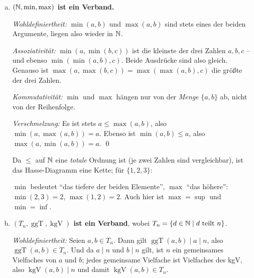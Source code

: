 \begin{loesung}
\begin{enumerate}[a)]
  Anschaulich: $A\cup B$ ist der \emph{tiefste gemeinsame Punkt oberhalb} von $A$ und $B$, $A\cap B$ der \emph{höchste gemeinsame Punkt unterhalb}. Beispiel: $\{a\}\cup\{b\}=\{a,b\}$ und $\{a,b\}\cap\{b,c\}=\{b\}$ -- beides direkt am Diagramm ablesbar. Es ist also $\cup=\sup$ und $\cap=\inf$ (vgl.\ Aufgabe~6).

  \item \textbf{$(\mathbb{N},\min,\max)$ ist ein Verband.}

  \emph{Wohldefiniertheit:} $\min(a,b)$ und $\max(a,b)$ sind stets eines der beiden Argumente, liegen also wieder in $\mathbb{N}$.

  \emph{Assoziativität:} $\min(a,\min(b,c))$ ist die kleinste der drei Zahlen $a,b,c$ -- und ebenso $\min(\min(a,b),c)$. Beide Ausdrücke sind also gleich. Genauso ist $\max(a,\max(b,c))=\max(\max(a,b),c)$ die größte der drei Zahlen.

  \emph{Kommutativität:} $\min$ und $\max$ hängen nur von der \emph{Menge} $\{a,b\}$ ab, nicht von der Reihenfolge.

  \emph{Verschmelzung:} Es ist stets $a\leq\max(a,b)$, also $\min(a,\max(a,b))=a$. Ebenso ist $\min(a,b)\leq a$, also $\max(a,\min(a,b))=a$. \qed

  Da $\leq$ auf $\mathbb{N}$ eine \emph{totale} Ordnung ist (je zwei Zahlen sind vergleichbar), ist das Hasse-Diagramm eine Kette; für $\{1,2,3\}$:
  \begin{center}
  \end{center}
  $\min$ bedeutet \enquote{das tiefere der beiden Elemente}, $\max$ \enquote{das höhere}: $\min(2,3)=2$, $\max(1,2)=2$. Auch hier ist $\max=\sup$ und $\min=\inf$.

  \item \textbf{$(T_n,\operatorname{ggT},\operatorname{kgV})$ ist ein Verband}, wobei $T_n=\{d\in\mathbb{N}\mid d\text{ teilt } n\}$.

  \emph{Wohldefiniertheit:} Seien $a,b\in T_n$. Dann gilt $\operatorname{ggT}(a,b)\mid a\mid n$, also $\operatorname{ggT}(a,b)\in T_n$. Und da $a\mid n$ und $b\mid n$ gilt, ist $n$ ein gemeinsames Vielfaches von $a$ und $b$; jedes gemeinsame Vielfache ist Vielfaches des kgV, also $\operatorname{kgV}(a,b)\mid n$ und damit $\operatorname{kgV}(a,b)\in T_n$.


\end{enumerate}
\end{loesung}
